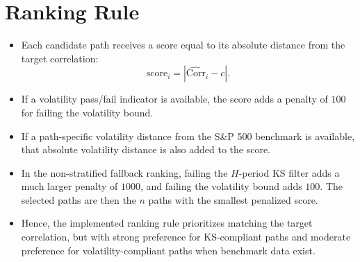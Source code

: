 \documentclass[11pt]{article}
\begin{document}
\section*{Ranking Rule}
\begin{itemize}
\item Each candidate path receives a score equal to its absolute distance from the target correlation:
\[
\text{score}_i = |\widehat{\mathrm{Corr}}_i - c|.
\]
\item If a volatility pass/fail indicator is available, the score adds a penalty of \(100\) for failing the volatility bound.
\item If a path-specific volatility distance from the S\&P 500 benchmark is available, that absolute volatility distance is also added to the score.
\item In the non-stratified fallback ranking, failing the \(H\)-period KS filter adds a much larger penalty of \(1000\), and failing the volatility bound adds \(100\). The selected paths are then the \(n\) paths with the smallest penalized score.
\item Hence, the implemented ranking rule prioritizes matching the target correlation, but with strong preference for KS-compliant paths and moderate preference for volatility-compliant paths when benchmark data exist.
\end{itemize}
\end{document}
